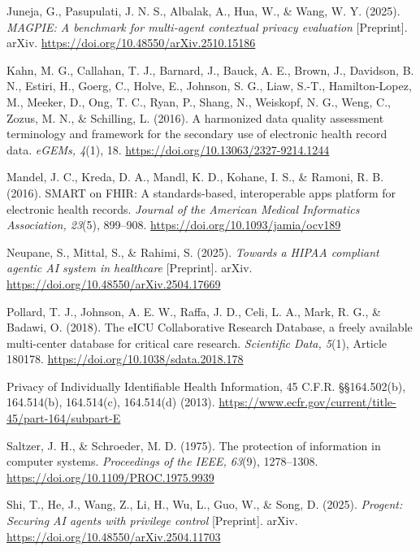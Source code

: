 Juneja, G., Pasupulati, J. N. S., Albalak, A., Hua, W., \& Wang, W. Y. (2025). \emph{MAGPIE: A benchmark
for multi-agent contextual privacy evaluation} [Preprint]. arXiv.
\url{https://doi.org/10.48550/arXiv.2510.15186}\par

Kahn, M. G., Callahan, T. J., Barnard, J., Bauck, A. E., Brown, J., Davidson, B. N., Estiri, H., Goerg,
C., Holve, E., Johnson, S. G., Liaw, S.-T., Hamilton-Lopez, M., Meeker, D., Ong, T. C., Ryan, P.,
Shang, N., Weiskopf, N. G., Weng, C., Zozus, M. N., \& Schilling, L. (2016). A harmonized data quality
assessment terminology and framework for the secondary use of electronic health record data.
\emph{eGEMs, 4}(1), 18. \url{https://doi.org/10.13063/2327-9214.1244}\par

Mandel, J. C., Kreda, D. A., Mandl, K. D., Kohane, I. S., \& Ramoni, R. B. (2016). SMART on FHIR: A
standards-based, interoperable apps platform for electronic health records. \emph{Journal of the
American Medical Informatics Association, 23}(5), 899--908. \url{https://doi.org/10.1093/jamia/ocv189}\par

Neupane, S., Mittal, S., \& Rahimi, S. (2025). \emph{Towards a HIPAA compliant agentic AI system in
healthcare} [Preprint]. arXiv. \url{https://doi.org/10.48550/arXiv.2504.17669}\par

Pollard, T. J., Johnson, A. E. W., Raffa, J. D., Celi, L. A., Mark, R. G., \& Badawi, O. (2018). The
eICU Collaborative Research Database, a freely available multi-center database for critical care
research. \emph{Scientific Data, 5}(1), Article 180178.
\url{https://doi.org/10.1038/sdata.2018.178}\par

Privacy of Individually Identifiable Health Information, 45 C.F.R. \S\S 164.502(b), 164.514(b), 164.514(c),
164.514(d) (2013). \url{https://www.ecfr.gov/current/title-45/part-164/subpart-E}\par

Saltzer, J. H., \& Schroeder, M. D. (1975). The protection of information in computer systems.
\emph{Proceedings of the IEEE, 63}(9), 1278--1308. \url{https://doi.org/10.1109/PROC.1975.9939}\par

Shi, T., He, J., Wang, Z., Li, H., Wu, L., Guo, W., \& Song, D. (2025). \emph{Progent: Securing AI agents
with privilege control} [Preprint]. arXiv. \url{https://doi.org/10.48550/arXiv.2504.11703}\par

